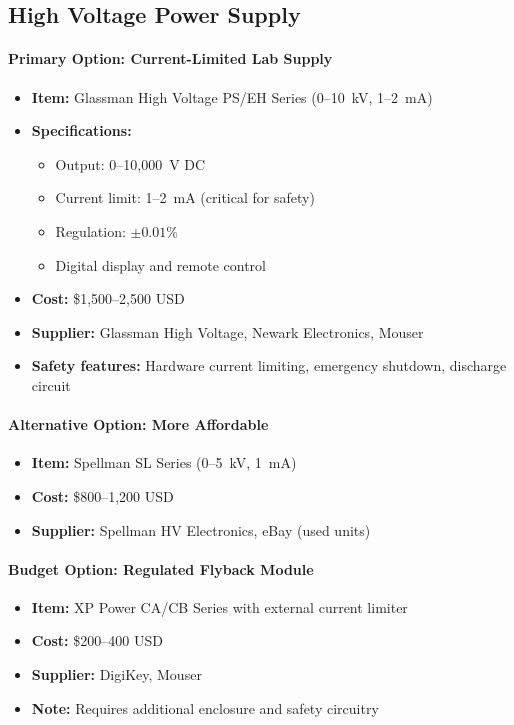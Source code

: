 \documentclass[11pt]{article}
\begin{document}
\subsection{High Voltage Power Supply}

\paragraph{Primary Option: Current-Limited Lab Supply}

\begin{itemize}
\item \textbf{Item:} Glassman High Voltage PS/EH Series (0--10~kV, 1--2~mA)
\item \textbf{Specifications:}
  \begin{itemize}
  \item Output: 0--10,000~V DC
  \item Current limit: 1--2~mA (critical for safety)
  \item Regulation: $\pm0.01\%$
  \item Digital display and remote control
  \end{itemize}
\item \textbf{Cost:} \$1,500--2,500 USD
\item \textbf{Supplier:} Glassman High Voltage, Newark Electronics, Mouser
\item \textbf{Safety features:} Hardware current limiting, emergency shutdown, discharge circuit
\end{itemize}

\paragraph{Alternative Option: More Affordable}

\begin{itemize}
\item \textbf{Item:} Spellman SL Series (0--5~kV, 1~mA)
\item \textbf{Cost:} \$800--1,200 USD
\item \textbf{Supplier:} Spellman HV Electronics, eBay (used units)
\end{itemize}

\paragraph{Budget Option: Regulated Flyback Module}

\begin{itemize}
\item \textbf{Item:} XP Power CA/CB Series with external current limiter
\item \textbf{Cost:} \$200--400 USD
\item \textbf{Supplier:} DigiKey, Mouser
\item \textbf{Note:} Requires additional enclosure and safety circuitry
\end{itemize}
\end{document}
